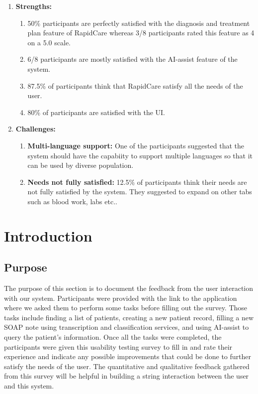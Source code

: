 \documentclass{article}
\begin{document}
\begin{enumerate}
    \item \textbf{Strengths:}
    \begin{enumerate}
        \item 50\% participants are perfectly satisfied with the diagnosis and treatment plan feature of RapidCare whereas  3/8 participants rated this feature as 4 on a 5.0 scale.
        \item 6/8 participants are mostly satisfied with the AI-assist feature of the system.
        \item 87.5\% of participants think that RapidCare satisfy all the needs of the user.
        \item 80\% of participants are satisfied with the UI.
    \end{enumerate}
    \item \textbf{Challenges:}
    \begin{enumerate}
        \item \textbf{Multi-language support:} One of the participants suggested that the system should have the capabiity to support multiple languages so that it can be used by diverse population. 
        \item \textbf{Needs not fully satisfied:} 12.5\% of participants think their needs are not fully satisfied by the system. They suggested to expand on other tabs such as blood work, labs etc..
    \end{enumerate}
\end{enumerate}

\newpage

\section{Introduction}

\subsection{Purpose}

The purpose of this section is to document the feedback from the user interaction with our system. Participants were provided with the link to the application where we asked them to perform some tasks before filling out the survey. Those tasks include finding a list of patients, creating a new patient record, filling a new SOAP note using transcription and classification services, and using AI-assist to query the patient's information. Once all the tasks were completed, the participants were given this usability testing survey to fill in and rate their experience and indicate any possible improvements that could be done to further satisfy the needs of the user. The quantitative and qualitative feedback gathered from this survey will be helpful in building a string interaction between the user and this system. 
\end{document}
